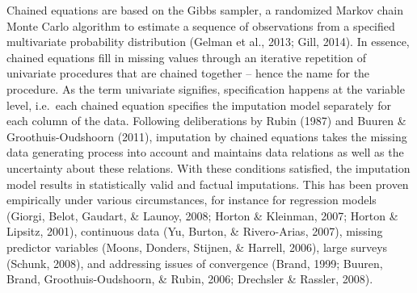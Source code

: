 \documentclass[12pt,econ]{sources/authesis}
\begin{document}
Chained equations are based on the Gibbs sampler, a randomized Markov chain Monte Carlo algorithm to estimate a sequence of observations from a specified multivariate probability distribution (Gelman et al., 2013; Gill, 2014). In essence, chained equations fill in missing values through an iterative repetition of univariate procedures that are chained together -- hence the name for the procedure. As the term univariate signifies, specification happens at the variable level, i.e.~each chained equation specifies the imputation model separately for each column of the data. Following deliberations by Rubin (1987) and Buuren \& Groothuis-Oudshoorn (2011), imputation by chained equations takes the missing data generating process into account and maintains data relations as well as the uncertainty about these relations. With these conditions satisfied, the imputation model results in statistically valid and factual imputations. This has been proven empirically under various circumstances, for instance for regression models (Giorgi, Belot, Gaudart, \& Launoy, 2008; Horton \& Kleinman, 2007; Horton \& Lipsitz, 2001), continuous data (Yu, Burton, \& Rivero-Arias, 2007), missing predictor variables (Moons, Donders, Stijnen, \& Harrell, 2006), large surveys (Schunk, 2008), and addressing issues of convergence (Brand, 1999; Buuren, Brand, Groothuis-Oudshoorn, \& Rubin, 2006; Drechsler \& Rassler, 2008).
\end{document}
